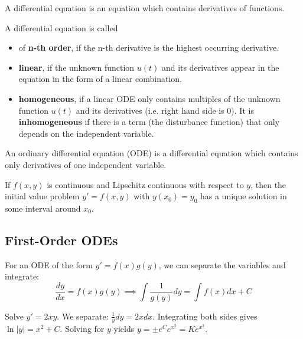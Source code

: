 \begin{definition}
    A differential equation is an equation which contains derivatives of functions.
\end{definition}

\begin{definition}
    A differential equation is called
    \begin{itemize}
        \item of \textbf{n-th order}, if the n-th derivative is the highest occurring derivative.
        \item \textbf{linear}, if the unknown function $u(t)$ and its derivatives appear in the equation in the form of a linear combination.
        \item \textbf{homogeneous}, if a linear ODE only contains multiples of the unknown function $u(t)$ and its derivatives (i.e. right hand side is 0). It is \textbf{inhomogeneous} if there is a term (the disturbance function) that only depends on the independent variable.
    \end{itemize}
\end{definition}

\begin{definition}
    An ordinary differential equation (ODE) is a differential equation which contains only derivatives of one independent variable.
\end{definition}

\begin{theorem}
    If $f(x, y)$ is continuous and Lipschitz continuous with respect to $y$, then the initial value problem $y' = f(x, y)$ with $y(x_0) = y_0$ has a unique solution in some interval around $x_0$.
\end{theorem}


\subsection{First-Order ODEs}

\begin{theorem}
    For an ODE of the form $y' = f(x)g(y)$, we can separate the variables and integrate:
    $$\frac{dy}{dx} = f(x)g(y) \implies \int \frac{1}{g(y)} dy = \int f(x) dx + C$$
\end{theorem}

\begin{example}
    Solve $y' = 2x y$. 
    We separate: $\frac{1}{y} dy = 2x dx$. 
    Integrating both sides gives $\ln|y| = x^2 + C$. 
    Solving for $y$ yields $y = \pm e^C e^{x^2} = K e^{x^2}$.
\end{example}

